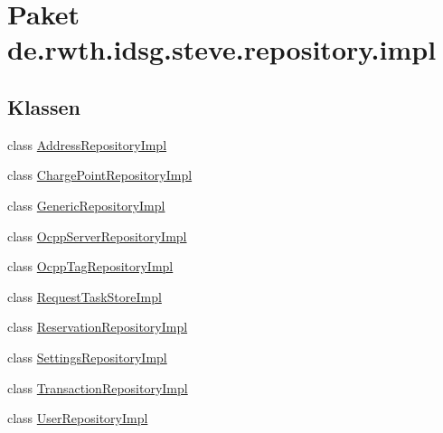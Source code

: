 \hypertarget{namespacede_1_1rwth_1_1idsg_1_1steve_1_1repository_1_1impl}{\section{Paket de.\+rwth.\+idsg.\+steve.\+repository.\+impl}
\label{namespacede_1_1rwth_1_1idsg_1_1steve_1_1repository_1_1impl}
}
\subsection*{Klassen}
\begin{DoxyCompactItemize}
\item 
class \hyperlink{classde_1_1rwth_1_1idsg_1_1steve_1_1repository_1_1impl_1_1_address_repository_impl}{Address\+Repository\+Impl}
\item 
class \hyperlink{classde_1_1rwth_1_1idsg_1_1steve_1_1repository_1_1impl_1_1_charge_point_repository_impl}{Charge\+Point\+Repository\+Impl}
\item 
class \hyperlink{classde_1_1rwth_1_1idsg_1_1steve_1_1repository_1_1impl_1_1_generic_repository_impl}{Generic\+Repository\+Impl}
\item 
class \hyperlink{classde_1_1rwth_1_1idsg_1_1steve_1_1repository_1_1impl_1_1_ocpp_server_repository_impl}{Ocpp\+Server\+Repository\+Impl}
\item 
class \hyperlink{classde_1_1rwth_1_1idsg_1_1steve_1_1repository_1_1impl_1_1_ocpp_tag_repository_impl}{Ocpp\+Tag\+Repository\+Impl}
\item 
class \hyperlink{classde_1_1rwth_1_1idsg_1_1steve_1_1repository_1_1impl_1_1_request_task_store_impl}{Request\+Task\+Store\+Impl}
\item 
class \hyperlink{classde_1_1rwth_1_1idsg_1_1steve_1_1repository_1_1impl_1_1_reservation_repository_impl}{Reservation\+Repository\+Impl}
\item 
class \hyperlink{classde_1_1rwth_1_1idsg_1_1steve_1_1repository_1_1impl_1_1_settings_repository_impl}{Settings\+Repository\+Impl}
\item 
class \hyperlink{classde_1_1rwth_1_1idsg_1_1steve_1_1repository_1_1impl_1_1_transaction_repository_impl}{Transaction\+Repository\+Impl}
\item 
class \hyperlink{classde_1_1rwth_1_1idsg_1_1steve_1_1repository_1_1impl_1_1_user_repository_impl}{User\+Repository\+Impl}
\end{DoxyCompactItemize}

